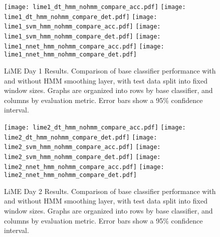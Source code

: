 \begin{figure}[H]
 \centering
 \texttt{[image: lime1\_dt\_hmm\_nohmm\_compare\_acc.pdf]} \hspace{1em}\vspace{1em}
 \texttt{[image: lime1\_dt\_hmm\_nohmm\_compare\_det.pdf]} 
 \texttt{[image: lime1\_svm\_hmm\_nohmm\_compare\_acc.pdf]} \hspace{1em}\vspace{1em}
 \texttt{[image: lime1\_svm\_hmm\_nohmm\_compare\_det.pdf]}
 \texttt{[image: lime1\_nnet\_hmm\_nohmm\_compare\_acc.pdf]} \hspace{1em}
 \texttt{[image: lime1\_nnet\_hmm\_nohmm\_compare\_det.pdf]}
 \caption{LiME Day 1 Results. Comparison of base classifier performance with and without HMM
  smoothing layer, with test data split into fixed window sizes. Graphs are organized into rows by base
  classifier, and columns by evaluation metric. Error bars show a 95\% confidence interval.}
 \label{fig:lime1_hmm}
\end{figure}

\begin{figure}[H]
 \centering
 \texttt{[image: lime2\_dt\_hmm\_nohmm\_compare\_acc.pdf]} \hspace{1em}\vspace{1em}
 \texttt{[image: lime2\_dt\_hmm\_nohmm\_compare\_det.pdf]} 
 \texttt{[image: lime2\_svm\_hmm\_nohmm\_compare\_acc.pdf]} \hspace{1em}\vspace{1em}
 \texttt{[image: lime2\_svm\_hmm\_nohmm\_compare\_det.pdf]}
 \texttt{[image: lime2\_nnet\_hmm\_nohmm\_compare\_acc.pdf]} \hspace{1em}
 \texttt{[image: lime2\_nnet\_hmm\_nohmm\_compare\_det.pdf]}
 \caption{LiME Day 2 Results. Comparison of base classifier performance with and without HMM
  smoothing layer, with test data split into fixed window sizes. Graphs are organized into rows by base
  classifier, and columns by evaluation metric. Error bars show a 95\% confidence interval.}
 \label{fig:lime2_hmm}
\end{figure}

